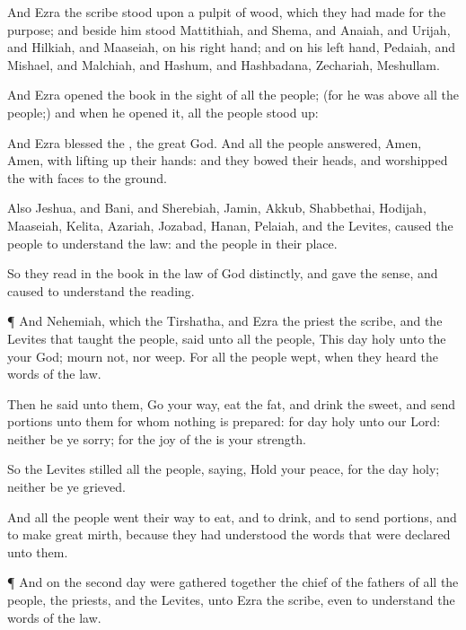 {And
Ezra the
scribe
stood upon a
pulpit of
wood, which they had
made for the
purpose; and
beside him
stood
Mattithiah, and
Shema, and
Anaiah, and
Urijah, and
Hilkiah, and
Maaseiah, on his right
hand; and on his left
hand,
Pedaiah, and
Mishael, and
Malchiah, and
Hashum, and
Hashbadana,
Zechariah,
{}
Meshullam.

And
Ezra
opened the
book in the
sight of all the
people; (for he was above all the
people;) and when he
opened it, all the
people stood
up:

And
Ezra
blessed the
{}, the
great
God. And all the
people
answered,
Amen,
Amen, with lifting
up their
hands: and they
bowed their heads, and
worshipped the
{} with
{}
faces to the
ground.

Also
Jeshua, and
Bani, and
Sherebiah,
Jamin,
Akkub,
Shabbethai,
Hodijah,
Maaseiah,
Kelita,
Azariah,
Jozabad,
Hanan,
Pelaiah, and the
Levites, caused the
people to
understand the
law: and the
people
{} in their
place.

So they
read in the
book in the
law of
God
distinctly, and
gave the
sense, and caused
{} to
understand the
reading.


\par }{\PP {}¶ And
Nehemiah, which
{} the
Tirshatha, and
Ezra the
priest the
scribe, and the
Levites that
taught the
people,
said unto all the
people, This
day
{}
holy unto the
{} your
God;
mourn not, nor
weep. For all the
people
wept, when they
heard the
words of the
law.

Then he
said unto them, Go your
way,
eat the
fat, and
drink the
sweet, and
send
portions unto them for whom nothing is
prepared: for
{}
day
{}
holy unto our
Lord: neither be ye
sorry; for the
joy of the
{} is your
strength.

So the
Levites
stilled all the
people,
saying, Hold your
peace, for the
day
{}
holy; neither be ye
grieved.

And all the
people went their
way to
eat, and to
drink, and to
send
portions, and to
make
great
mirth, because they had
understood the
words that were
declared unto them.


\par }{\PP {}¶ And on the
second
day were gathered
together the
chief of the
fathers of all the
people, the
priests, and the
Levites, unto
Ezra the
scribe, even to
understand the
words of the
law.

}
